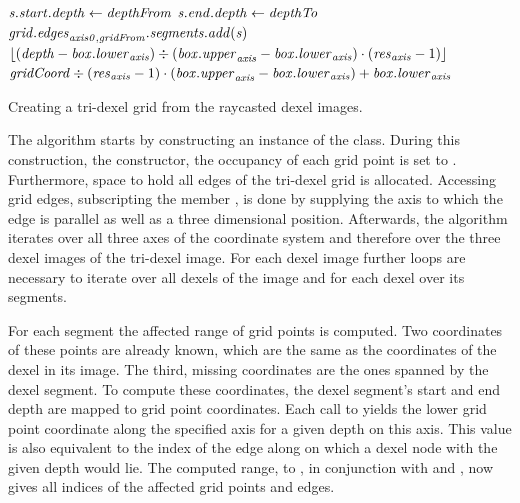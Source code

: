 \begin{algorithm}
\begin{algorithmic}[1]
									\State $\mathit{s}.\mathit{start}.\mathit{depth} \gets \mathit{depthFrom}$
								\EndIf
									\State $\mathit{s}.\mathit{end}.\mathit{depth} \gets \mathit{depthTo}$
								\EndIf
								\State $\mathit{grid}.\mathit{edges}_{\mathit{axis0}, \mathit{gridFrom}}.\mathit{segments}.\mathit{add}(\mathit{s})$ \label{line:grid_edge_insertion}
							\EndFor
						\EndFor
					\EndFor
				\EndFor
			\EndFor
		\EndFunction
		\\
			\State \Return $\lfloor(\mathit{depth} - \mathit{box}.\mathit{lower}_{\mathit{axis}}) \div (\mathit{box}.\mathit{upper}_{\mathit{axis}} - \mathit{box}.\mathit{lower}_{\mathit{axis}}) \cdot (\mathit{res}_{\mathit{axis}} - 1)\rfloor$
		\EndFunction
		\\
			\State \Return $\mathit{gridCoord} \div (\mathit{res}_{\mathit{axis}} - 1) \cdot (\mathit{box}.\mathit{upper}_{\mathit{axis}} - \mathit{box}.\mathit{lower}_{\mathit{axis}}) + \mathit{box}.\mathit{lower}_{\mathit{axis}}$
		\EndFunction
	\end{algorithmic}
	\caption{
		Creating a tri-dexel grid from the raycasted dexel images.
	}
	\label{alg:tri_dexel_grid_generation}
\end{algorithm}
%
The algorithm starts by constructing an instance of the  class.
During this construction, \ie the constructor, the occupancy of each grid point is set to \False.
Furthermore, space to hold all edges of the tri-dexel grid is allocated.
Accessing grid edges, \ie subscripting the member , is done by supplying the axis to which the edge is parallel as well as a three dimensional position.
Afterwards, the algorithm iterates over all three axes of the coordinate system and therefore over the three dexel images of the tri-dexel image.
For each dexel image further loops are necessary to iterate over all dexels of the image and for each dexel over its segments.

For each segment the affected range of grid points is computed.
Two coordinates of these points are already known, which are the same as the coordinates of the dexel in its image.
The third, missing coordinates are the ones spanned by the dexel segment.
To compute these coordinates, the dexel segment's start and end depth are mapped to grid point coordinates.
Each call to  yields the lower grid point coordinate along the specified axis for a given depth on this axis.
This value is also equivalent to the index of the edge along  on which a dexel node with the given depth would lie.
The computed range,  to , in conjunction with  and , now gives all indices of the affected grid points and edges.

